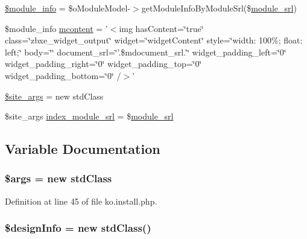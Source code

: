 \begin{DoxyCompactItemize}
\item 
\hyperlink{ko_8install_8php_a5e701819149f6ea0893d4b79010417d3}{\$module\+\_\+info} = \$o\+Module\+Model-\/$>$get\+Module\+Info\+By\+Module\+Srl(\$\hyperlink{ko_8install_8php_a370bb6450fab1da3e0ed9f484a38b761}{module\+\_\+srl})
\item 
\$module\+\_\+info \hyperlink{ko_8install_8php_a9da4bb6e77356bb68ae0e05dbd9f5e2f}{mcontent} = '$<$img has\+Content=\char`\"{}true\char`\"{} class=\char`\"{}zbxe\+\_\+widget\+\_\+output\char`\"{} widget=\char`\"{}widget\+Content\char`\"{} style=\char`\"{}width\+: 100\%; float\+: left;\char`\"{} body=\char`\"{}\char`\"{} document\+\_\+srl=\char`\"{}'.\$mdocument\+\_\+srl.'\char`\"{} widget\+\_\+padding\+\_\+left=\char`\"{}0\char`\"{} widget\+\_\+padding\+\_\+right=\char`\"{}0\char`\"{} widget\+\_\+padding\+\_\+top=\char`\"{}0\char`\"{} widget\+\_\+padding\+\_\+bottom=\char`\"{}0\char`\"{} /$>$'
\item 
\hyperlink{ko_8install_8php_a19e0fcfacd69155c9cc255e5500f6ccc}{\$site\+\_\+args} = new std\+Class
\item 
\$site\+\_\+args \hyperlink{ko_8install_8php_acd0b17bfe6d14c82871d73fa39c9c22d}{index\+\_\+module\+\_\+srl} = \$\hyperlink{ko_8install_8php_a370bb6450fab1da3e0ed9f484a38b761}{module\+\_\+srl}
\end{DoxyCompactItemize}


\subsection{Variable Documentation}
\hypertarget{ko_8install_8php_a67e94494731d99ed23b123e95175bc10}{
\subsubsection[{\$args}]{\setlength{\rightskip}{0pt plus 5cm}\$args = new std\+Class}}\label{ko_8install_8php_a67e94494731d99ed23b123e95175bc10}


Definition at line 45 of file ko.\+install.\+php.

\hypertarget{ko_8install_8php_a99e144f7d563ceb76b003d54739b3b0c}{
\subsubsection[{\$design\+Info}]{\setlength{\rightskip}{0pt plus 5cm}\$design\+Info = new std\+Class()}}\label{ko_8install_8php_a99e144f7d563ceb76b003d54739b3b0c}


